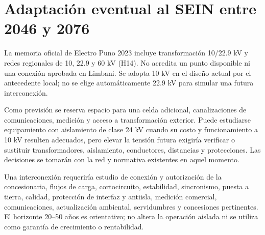 \section{Adaptación eventual al SEIN entre 2046 y 2076}
La memoria oficial de Electro Puno 2023 incluye transformación 10/22.9 kV y redes regionales de 10, 22.9 y 60 kV (H14). No acredita un punto disponible ni una conexión aprobada en Limbani. Se adopta 10 kV en el diseño actual por el antecedente local; no se elige automáticamente 22.9 kV para simular una futura interconexión.

Como previsión se reserva espacio para una celda adicional, canalizaciones de comunicaciones, medición y acceso a transformación exterior. Puede estudiarse equipamiento con aislamiento de clase 24 kV cuando su costo y funcionamiento a 10 kV resulten adecuados, pero elevar la tensión futura exigiría verificar o sustituir transformadores, aislamiento, conductores, distancias y protecciones. Las decisiones se tomarán con la red y normativa existentes en aquel momento.

Una interconexión requeriría estudio de conexión y autorización de la concesionaria, flujos de carga, cortocircuito, estabilidad, sincronismo, puesta a tierra, calidad, protección de interfaz y antiisla, medición comercial, comunicaciones, actualización ambiental, servidumbres y concesiones pertinentes. El horizonte 20--50 años es orientativo; no altera la operación aislada ni se utiliza como garantía de crecimiento o rentabilidad.
